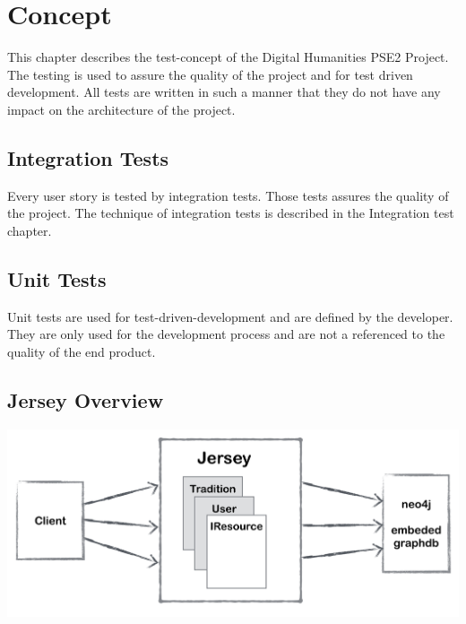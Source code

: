 \documentclass[11pt,fleqn,openany]{book} %
\begin{document}


\chapter{Concept}
This chapter describes the test-concept of the Digital Humanities PSE2 Project. The testing is used to assure the quality of the project and for test driven development. All tests are written in such a manner that they do not have any impact on the architecture of the project. 

\section*{Integration Tests}
Every user story is tested by integration tests. Those tests assures the quality of the project. The technique of integration tests is described in the Integration test chapter. 

\section*{Unit Tests}
Unit tests are used for test-driven-development and are defined by the developer. They are only used for the development process and are not a referenced to the quality of the end product.

\newpage

\section*{Jersey Overview} 

\begin{center}
\includegraphics[scale=.40]{Pictures/jerseyoverview.png} 
\end{center}
\end{document}

